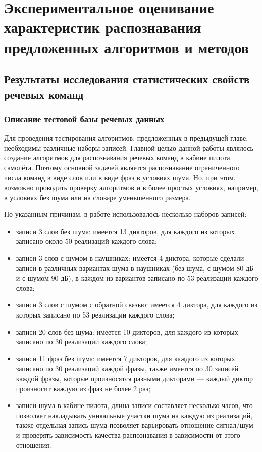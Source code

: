 \chapter{Экспериментальное оценивание характеристик распознавания предложенных алгоритмов и методов} \label{chapt3}

\section{Результаты исследования статистических свойств речевых команд} \label{sect3_1}

\subsection{Описание тестовой базы речевых данных} \label{sect3_1_1}

Для проведения тестирования алгоритмов, предложенных в предыдущей главе, необходимы различные наборы записей.
Главной целью данной работы являлось создание алгоритмов для распознавания речевых команд в кабине пилота самолёта.
Поэтому основной задачей является распознавание ограниченного числа команд в виде слов или в виде фраз в условиях шума.
Но, при этом, возможно проводить проверку алгоритмов и в более простых условиях, например, в условиях без шума или на словаре уменьшенного размера.

По указанным причинам, в работе использовалось несколько наборов записей:
\begin{itemize}
	\item записи 3 слов без шума: имеется 13 дикторов, для каждого из которых записано около 50 реализаций каждого слова;
	\item записи 3 слов с шумом в наушниках: имеется 4 диктора, которые сделали записи в различных вариантах шума в наушниках (без шума, с шумом 80 дБ и с шумом 90 дБ), в каждом из вариантов записано по 53 реализации каждого слова;
	\item записи 3 слов с шумом с обратной связью: имеется 4 диктора, для каждого из которых записано по 53 реализации каждого слова;
	\item записи 20 слов без шума: имеется 10 дикторов, для каждого из которых записано по 30 реализации каждого слова;
	\item записи 11 фраз без шума: имеется 7 дикторов, для каждого из которых записано по 30 реализаций каждой фразы, также имеется по 30 записей каждой фразы, которые произносятся разными дикторами --- каждый диктор произносит каждую из фраз не более 2 раз;
	\item записи шума в кабине пилота, длина записи составляет несколько часов, что позволяет накладывать уникальные участки шума на каждую из реализаций, также отдельная запись шума позволяет варьировать отношение сигнал/шум и проверять зависимость качества распознавания в зависимости от этого отношения.
\end{itemize}

